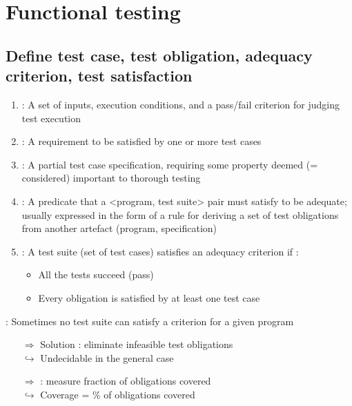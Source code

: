 \chapter{Functional testing}

\section{Define test case, test obligation, adequacy criterion, test satisfaction}

\begin{enumerate}
    \item {} : A set of inputs, execution conditions, and a pass/fail criterion for judging test execution
    \item {} : A requirement to be satisfied by one or more test cases
    \item {} : A partial test case specification, requiring some property deemed (= considered) important to thorough testing
    \item {}: A predicate that a <program, test suite> pair must satisfy to be adequate; usually expressed in the form of a rule for deriving a set of test obligations from another artefact (program, specification)
    \item {}:
    A test suite (set of test cases) satisfies an adequacy criterion if :
    \begin{itemize}
        \item All the tests succeed (pass)
        \item Every obligation is satisfied by at least one test case
    \end{itemize}
\end{enumerate}

: Sometimes no test suite can satisfy a criterion for a given program
\begin{itemize}
    \item [$\Rightarrow$] Solution : eliminate infeasible test obligations\\
    $\hookrightarrow$ Undecidable in the general case
    \item [$\Rightarrow$] : measure fraction of obligations covered\\
    $\hookrightarrow$ Coverage = \% of obligations covered
\end{itemize}


